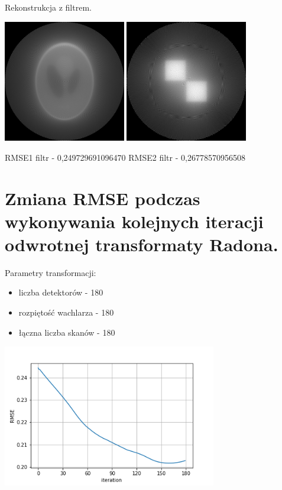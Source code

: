 \documentclass[a4paper, 11pt]{article}
\begin{document}
\begin{center}
	Rekonstrukcja z filtrem.


	\includegraphics[width=0.4\textwidth]{reconstructed_filtered1.png}
	\includegraphics[width=0.4\textwidth]{reconstructed_filtered2.png}

	RMSE1 filtr - 0,249729691096470\hspace{1.5cm} RMSE2 filtr - 0,26778570956508
\end{center}

\section{Zmiana RMSE podczas wykonywania kolejnych iteracji odwrotnej transformaty Radona.}


Parametry transformacji:
\begin{itemize}
	\item liczba detektorów - 180
	\item rozpiętość wachlarza - 180\degree
	\item łączna liczba skanów - 180
\end{itemize}
\begin{center}
	\includegraphics[width=0.7\textwidth]{change.png}
\end{center}
\end{document}
